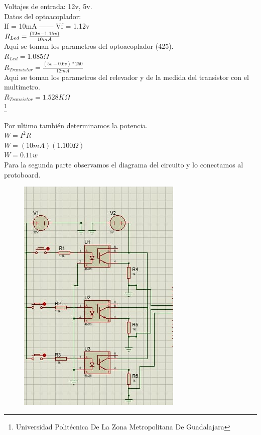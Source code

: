 \documentclass[11pt,a4paper]{article}
\begin{document}
Voltajes de entrada: 12v, 5v.\\

Datos del optoacoplador:\\

If = 10mA ------
Vf = 1.12v\\

{\Large $ R_{Led} = {\Large \frac{(12v - 1.15v)}{10mA}}$} \\Aqui se toman los parametros del optoacoplador (425).\\

{\Large $R_{Led} = 1.085\Omega$}\\

{\Large $R_{Transistor} = \frac{(5v - 0.6v)*250}{12mA}$}\\ Aqui se toman los parametros del relevador y de la medida del transistor con el multimetro.\\

{\Large $R_{Transistor} = 1.528K\Omega$}\\

\footnote{Universidad Politécnica De La Zona Metropolitana De Guadalajara}
\newpage

Por ultimo también determinamos la potencia.\\

$ W = I^2 R $\\ 

$ W = (10mA)(1.100\Omega)$\\

$ W = 0.11w $\\

Para la segunda parte observamos el diagrama del circuito y lo conectamos al protoboard.

\begin{figure}[hbtp]
\centering
\includegraphics[scale=0.60]{entrada.png} 
\end{figure}
\end{document}
